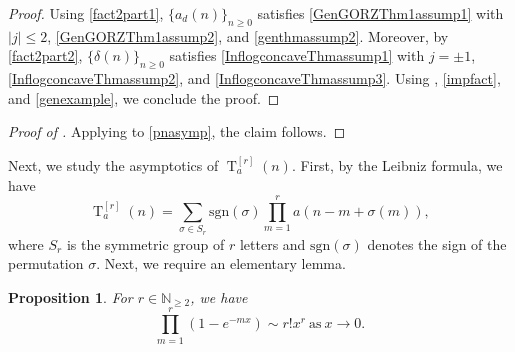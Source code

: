 \documentclass[11pt,reqno,a4paper]{amsart}
\newcommand{\s}{{\sigma}}
\renewcommand{\d}{{\delta}}
\renewcommand{\(}{\left\(}
\renewcommand{\)}{\right\)}
\numberwithin{equation}{section}
\theoremstyle{plain}
\newtheorem{proposition}[theorem]{Proposition}
\theoremstyle{definition} %
\numberwithin{equation}{section}
\begin{document}
\begin{proof}
Using  \ref{fact2part1}, $\{a_d(n)\}_{n\ge 0}$ satisfies \ref{GenGORZThm1assump1} with $|j|\le 2$, \ref{GenGORZThm1assump2}, and \ref{genthmassump2}. Moreover, by  \ref{fact2part2}, $\{\d(n)\}_{n\ge 0}$ satisfies \ref{InflogconcaveThmassump1} with $j=\pm 1$, \ref{InflogconcaveThmassump2}, and \ref{InflogconcaveThmassump3}. Using , \eqref{impfact}, and \eqref{genexample}, we conclude the proof.\qedhere
 \end{proof}





\begin{proof}[Proof of ]
 Applying  to \eqref{pnasymp}, the claim follows.\qedhere 
\end{proof}








 Next, we study the asymptotics of $\operatorname{T}^{[r]}_a(n)$. First, by the Leibniz formula, we have 
\begin{equation}\label{det}
\operatorname{T}^{[r]}_a(n)%
=\sum_{\sigma\in S_r}\text{sgn}(\s)\prod_{m=1}^{r}a\left(n-m+\s(m)\right),
\end{equation} 
where $S_r$ is the symmetric group of $r$ letters and $\text{sgn}(\s)$ denotes the sign of the permutation $\s$. Next, we require an elementary lemma.

\begin{proposition}\label{propdet}
	For $r\in \mathbb{N}_{\ge 2}$, we have 
	\[
	\prod_{m=1}^{r}\left(1-e^{-m x}\right)\sim r! x^r\ \text{as}\ x\to 0.
	\]	
\end{proposition}
\end{document}
